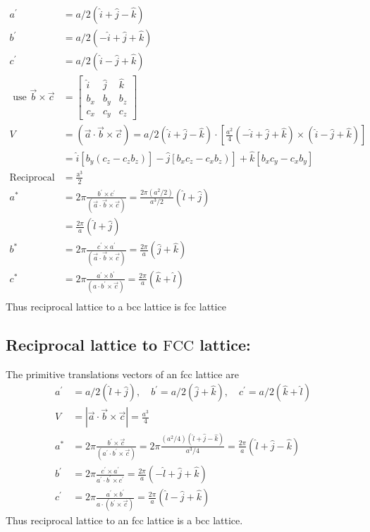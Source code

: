 \begin{align*}
a^{\prime}&=a / 2(\hat{i}+\hat{j}-\hat{k}) \\
b^{\prime}&=a / 2(-\hat{i}+\hat{j}+\hat{k}) \\
c^{\prime}&=a / 2(\hat{i}-\hat{j}+\hat{k}) \\
\text { use } \vec{b} \times \vec{c}&=\left[\begin{array}{lll}\hat{i} & \hat{j} & \hat{k} \\b_{x} & b_{y} & b_{z} \\c_{x} & c_{y} & c_{z}\end{array}\right]\\
V&=(\vec{a} \cdot \vec{b} \times \vec{c})=a / 2(\hat{i}+\hat{j}-\hat{k}) \cdot\left[\frac{a^{2}}{4}(-\hat{i}+\hat{j}+\hat{k}) \times(\hat{i}-\hat{j}+\hat{k})\right] \\
&=\left.\hat{i}\left[b_{y}\left(c_{z}-c_{z} b_{z}\right)\right]-\hat{j}\left[b_{x} c_{z}-c_{x} b_{z}\right)\right]+\hat{k}\left[b_{x} c_{y}-c_{x} b_{y}\right]\\
\text{Reciprocal lattice vector} &=\frac{\mathrm{a}^{3}}{2}\\
a^{*}&=2 \pi \frac{b^{\prime} \times c^{\prime}}{(\vec{a} \cdot \vec{b} \times \vec{c})}=\frac{2 \pi\left(a^{2} / 2\right)}{a^{3} / 2}(\hat{l}+\hat{j})\\&=\frac{2 \pi}{a}(\hat{l}+\hat{j})\\
b^{*}&=2 \pi \frac{c^{\prime} \times a^{\prime}}{(\vec{a} \cdot \vec{b} \times \vec{c})}=\frac{2 \pi}{a}(\hat{j}+\hat{k})\\
c^{*} &=2 \pi \frac{a^{\prime} \times b^{\prime}}{\left(a\cdot b^{\prime} \times \vec{c}\right)}=\frac{2 \pi}{a}(\hat{k}+\hat{l})\\
\end{align*}
Thus reciprocal lattice to a bcc lattice is fcc lattice

\subsection{Reciprocal lattice to $\mathrm{FCC}$ lattice:}

The primitive translations vectors of an fcc lattice are
\begin{align*}
a^{\prime}&=a / 2(\hat{l}+\hat{j}), \quad b^{\prime}=a / 2(\hat{j}+\hat{k}), \quad  c^{\prime}=a / 2(\hat{k}+\hat{l})  \\
V&=|\vec{a} \cdot \vec{b} \times \vec{c}|=\frac{a^{3}}{4}\\
a^{*}&=2 \pi \frac{b^{\prime} \times \vec{c}}{\left(a^{\prime} \cdot b^{\prime} \times \vec{c}\right)}=2 \pi \frac{\left(a^{2} / 4\right)(\hat{l}+\hat{j}-\hat{k})}{a^{3} / 4}=\frac{2 \pi}{a}(\hat{l}+\hat{j}-\hat{k}) \\
b^{\prime}&=2 \pi \frac{c^{\prime} \times a^{\prime}}{a^{\prime} \cdot b^{\prime} \times c^{\prime}}=\frac{2 \pi}{a}(-\hat{l}+\hat{j}+\hat{k})\\
c^{\prime}&=2 \pi \frac{a^{\prime} \times b^{\prime}}{a \cdot\left(b^{\prime} \times \vec{c}\right)}=\frac{2 \pi}{a}(\hat{l}-\hat{j}+\hat{k})
\end{align*}
Thus reciprocal lattice to an fcc lattice is a bcc lattice.

